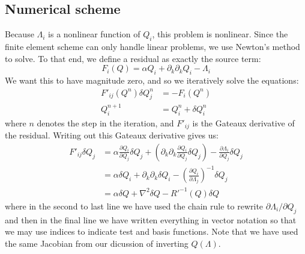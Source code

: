 \documentclass[reqno]{article}
\begin{document}
	\subsection{Numerical scheme}
	Because $\Lambda_i$ is a nonlinear function of $Q_i$, this problem is nonlinear.
	Since the finite element scheme can only handle linear problems, we use Newton's method to solve.
	To that end, we define a residual as exactly the source term:
	\begin{equation}
		F_i (Q)
		= \alpha Q_i + \partial_k \partial_k Q_i - \Lambda_i
	\end{equation}
	We want this to have magnitude zero, and so we iteratively solve the equations:
	\begin{align}
		F'_{ij} (Q^n) \delta Q^n_j &= -F_i(Q^n) \label{eq:isotropic-linear} \\
		Q^{n + 1}_i &= Q^n_i + \delta Q^n_i
	\end{align}
	where $n$ denotes the step in the iteration, and $F'_{ij}$ is the Gateaux derivative of the residual. 
	Writing out this Gateaux derivative gives us:
	\begin{equation}
	\begin{split}
		F'_{ij} \delta Q_{j}
		&= \alpha \frac{\partial Q_i}{\partial Q_j} \delta Q_j
		+ \left(\partial_k \partial_k \frac{\partial Q_i}{\partial Q_j} \delta Q_j \right)
		- \frac{\partial \Lambda_i}{\partial Q_j} \delta Q_j \\
		&= \alpha \delta Q_i
		+ \partial_k \partial_k \delta Q_i
		- \left(\frac{\partial Q_i}{\partial \Lambda_j}\right)^{-1} \delta Q_j \\
		&= \alpha \delta Q + \nabla^2 \delta Q - R'^{-1} (Q) \delta Q
	\end{split}
	\end{equation}
	where in the second to last line we have used the chain rule to rewrite $\partial \Lambda_i / \partial Q_j$ and then in the final line we have written everything in vector notation so that we may use indices to indicate test and basis functions.
	Note that we have used the same Jacobian from our dicussion of inverting $Q(\Lambda)$.
	
\end{document}
